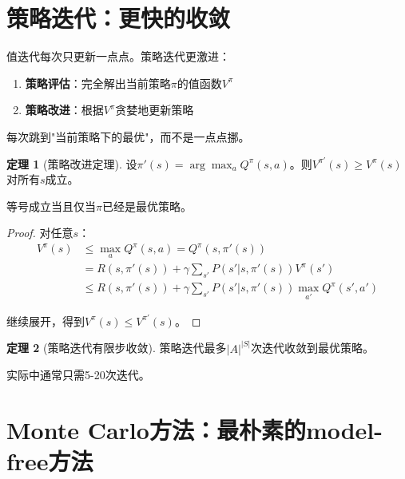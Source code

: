 \documentclass[11pt,a4paper]{article}
\theoremstyle{definition}
\newtheorem{theorem}{定理}[section]
\begin{document}
\section{策略迭代：更快的收敛}

\begin{plainwords}
值迭代每次只更新一点点。策略迭代更激进：

\begin{enumerate}
    \item \textbf{策略评估}：完全解出当前策略$\pi$的值函数$V^\pi$
    \item \textbf{策略改进}：根据$V^\pi$贪婪地更新策略
\end{enumerate}

每次跳到"当前策略下的最优"，而不是一点点挪。
\end{plainwords}

\begin{theorem}[策略改进定理]
设$\pi'(s) = \arg\max_a Q^\pi(s,a)$。则$V^{\pi'}(s) \geq V^\pi(s)$对所有$s$成立。

等号成立当且仅当$\pi$已经是最优策略。
\end{theorem}

\begin{proof}
对任意$s$：
\begin{align*}
V^\pi(s) &\leq \max_a Q^\pi(s,a) = Q^\pi(s, \pi'(s)) \\
&= R(s, \pi'(s)) + \gamma \sum_{s'} P(s'|s, \pi'(s)) V^\pi(s') \\
&\leq R(s, \pi'(s)) + \gamma \sum_{s'} P(s'|s, \pi'(s)) \max_{a'} Q^\pi(s', a')
\end{align*}

继续展开，得到$V^\pi(s) \leq V^{\pi'}(s)$。
\end{proof}

\begin{theorem}[策略迭代有限步收敛]
策略迭代最多$|A|^{|S|}$次迭代收敛到最优策略。

实际中通常只需5-20次迭代。
\end{theorem}

\section{Monte Carlo方法：最朴素的model-free方法}
\end{document}
